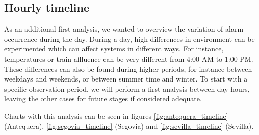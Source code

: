 \subsection{Hourly timeline}
As an additional first analysis, we wanted to overview the variation of alarm occurrence during the day. During a day, high differences in environment can be experimented which can affect systems in different ways. For instance, temperatures or train affluence can be very different from 4:00 AM to 1:00 PM. These differences can also be found during higher periods, for instance between weekdays and weekends, or between summer time and winter. To start with a specific observation period, we will perform a first analysis between day hours, leaving the other cases for future stages if considered adequate.

Charts with this analysis can be seen in figures \ref{fig:antequera_timeline} (Antequera), \ref{fig:segovia_timeline} (Segovia) and \ref{fig:sevilla_timeline} (Sevilla).

